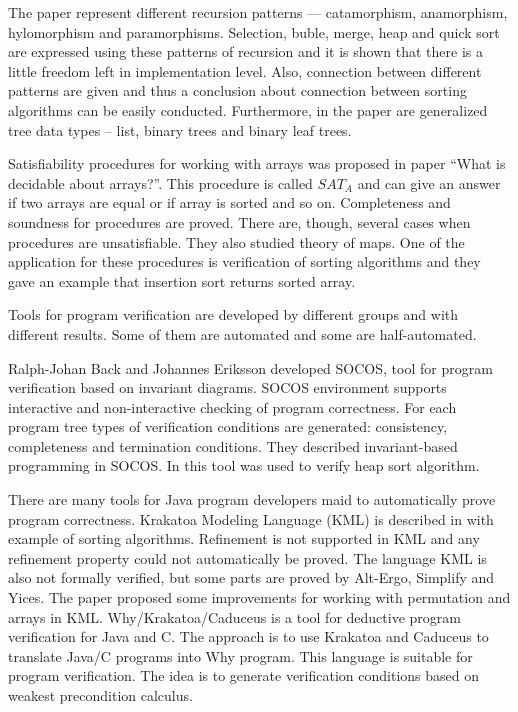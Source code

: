 \documentclass[11pt,a4paper]{article}
\begin{document}
The paper \cite{sortMorp} represent different recursion
patterns --- catamorphism, anamorphism, hylomorphism and
paramorphisms. Selection, buble, merge, heap and quick sort are
expressed using these patterns of recursion and it is shown that there
is a little freedom left in implementation level. Also, connection
between different patterns are given and thus a conclusion about
connection between sorting algorithms can be easily
conducted. Furthermore, in the paper are generalized tree data types
-- list, binary trees and binary leaf trees.

Satisfiability procedures for working with arrays was proposed in
paper ``What is decidable about arrays?''\cite{arrays}. This procedure
is called $SAT_A$ and can give an answer if two arrays are equal or if
array is sorted and so on. Completeness and soundness for procedures
are proved. There are, though, several cases when procedures are
unsatisfiable. They also studied theory of maps. One of the
application for these procedures is verification of sorting algorithms
and they gave an example that insertion sort returns sorted array. 

Tools for program verification are developed by different groups and
with different results. Some of them are automated and some are
half-automated.

Ralph-Johan Back and Johannes Eriksson \cite{socos} developed SOCOS,
tool for program verification based on invariant diagrams. SOCOS
environment supports interactive and non-interactive checking of
program correctness. For each program tree types of verification
conditions are generated: consistency, completeness and termination
conditions. They described invariant-based programming in SOCOS. In
\cite{back2011correct} this tool was used to verify heap sort
algorithm.

There are many tools for Java program developers maid to automatically
prove program correctness. Krakatoa Modeling Language (KML) is
described in \cite{spsa} with example of sorting
algorithms. Refinement is not supported in KML and any refinement
property could not automatically be proved. The language KML is also
not formally verified, but some parts are proved by Alt-Ergo, Simplify
and Yices. The paper proposed some improvements for working with
permutation and arrays in KML. Why/Krakatoa/Caduceus\cite{krakatoa} is
a tool for deductive program verification for Java and C. The approach
is to use Krakatoa and Caduceus to translate Java/C programs into Why
program. This language is suitable for program verification. The idea
is to generate verification conditions based on weakest precondition
calculus.
\end{document}
